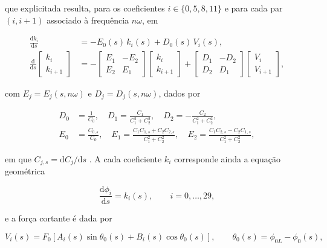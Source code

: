 \documentclass[arial,centeredequations,english,brazilian,oneside,section=TITLE]{ifes8}
\begin{document}
que explicitada resulta, para os coeficientes $i \in \{0, 5, 8, 11\}$ e para cada par
$(i, i+1)$ associado à frequência $n\omega$, em \cite{Caire2011}

\begin{align}
  \frac{\mathrm{d}k_i}{\mathrm{d}s} &= -E_0(s)\,k_i(s) + D_0(s)\,V_i(s),
    \label{eq:bloco-escalar}\\
  \frac{\mathrm{d}}{\mathrm{d}s}
  \begin{bmatrix} k_i \\ k_{i+1} \end{bmatrix}
  &= -\begin{bmatrix} E_1 & -E_2 \\ E_2 & E_1 \end{bmatrix}
  \begin{bmatrix} k_i \\ k_{i+1} \end{bmatrix}
  + \begin{bmatrix} D_1 & -D_2 \\ D_2 & D_1 \end{bmatrix}
  \begin{bmatrix} V_i \\ V_{i+1} \end{bmatrix},
    \label{eq:bloco-par}
\end{align}

com $E_j = E_j(s, n\omega)$ e $D_j = D_j(s, n\omega)$, dados por

\begin{align}
  D_0 &= \frac{1}{C_0}, \quad
  D_1 = \frac{C_1}{C_1^2 + C_2^2}, \quad
  D_2 = -\frac{C_2}{C_1^2 + C_2^2}, \label{eq:coef-D}\\
  E_0 &= \frac{C_{0,s}}{C_0}, \quad
  E_1 = \frac{C_1 C_{1,s} + C_2 C_{2,s}}{C_1^2 + C_2^2}, \quad
  E_2 = \frac{C_1 C_{2,s} - C_2 C_{1,s}}{C_1^2 + C_2^2}, \label{eq:coef-E}
\end{align}

em que $C_{j,s} = \mathrm{d}C_j/\mathrm{d}s$ \cite{Caire2011}. A cada coeficiente
$k_i$ corresponde ainda a equação geométrica

\begin{equation}
  \label{eq:geo-phi-i}
  \frac{\mathrm{d}\phi_i}{\mathrm{d}s} = k_i(s), \qquad i = 0, \ldots, 29,
\end{equation}

e a força cortante é dada por \cite{Caire2011}

\begin{equation}
  \label{eq:Vi}
  V_i(s) = F_0\left[A_i(s)\sin\theta_0(s) + B_i(s)\cos\theta_0(s)\right],
  \qquad \theta_0(s) = \phi_{0L} - \phi_0(s),
\end{equation}
\end{document}
